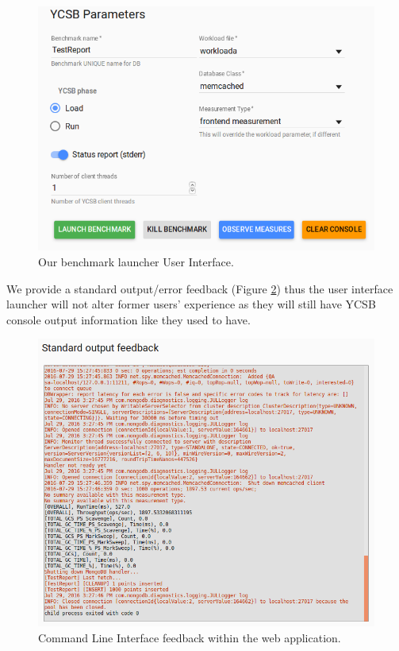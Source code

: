 \documentclass[a4paper,11pt]{report}
\begin{document}
\begin{figure}[ht]
\begin{center}
\includegraphics[width=1\linewidth]{images/launcher_ui.png}
\caption{Our benchmark launcher User Interface.}
\label{launcher_ui}
\end{center}
\end{figure}

We provide a standard output/error feedback (Figure \ref{cli_feedback}) thus the user interface launcher will not alter former users' experience as they will still have YCSB console output information like they used to have.

\begin{figure}[ht]
\begin{center}
\includegraphics[width=1\linewidth]{images/cli_feedback.png}
\caption{Command Line Interface feedback within the web application.}
\label{cli_feedback}
\end{center}
\end{figure}
\end{document}
